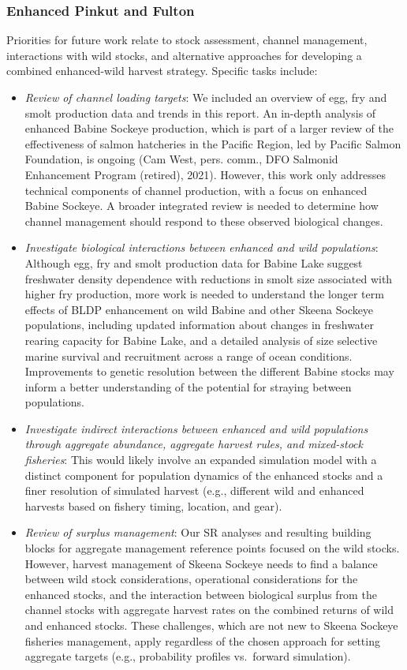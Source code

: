 \documentclass[french,11pt]{book}
\begin{document}
\subsubsection{Enhanced Pinkut and Fulton}\label{enhanced-pinkut-and-fulton}

Priorities for future work relate to stock assessment, channel management, interactions with wild stocks, and alternative approaches for developing a combined enhanced-wild harvest strategy. Specific tasks include:
\begin{itemize}

\item
  \emph{Review of channel loading targets}: We included an overview of egg, fry and smolt production data and trends in this report. An in-depth analysis of enhanced Babine Sockeye production, which is part of a larger review of the effectiveness of salmon hatcheries in the Pacific Region, led by Pacific Salmon Foundation, is ongoing (Cam West, pers. comm., DFO Salmonid Enhancement Program (retired), 2021). However, this work only addresses technical components of channel production, with a focus on enhanced Babine Sockeye. A broader integrated review is needed to determine how channel management should respond to these observed biological changes.
\item
  \emph{Investigate biological interactions between enhanced and wild populations}: Although egg, fry and smolt production data for Babine Lake suggest freshwater density dependence with reductions in smolt size associated with higher fry production, more work is needed to understand the longer term effects of BLDP enhancement on wild Babine and other Skeena Sockeye populations, including updated information about changes in freshwater rearing capacity for Babine Lake, and a detailed analysis of size selective marine survival and recruitment across a range of ocean conditions. Improvements to genetic resolution between the different Babine stocks may inform a better understanding of the potential for straying between populations.\\
\item
  \emph{Investigate indirect interactions between enhanced and wild populations through aggregate abundance, aggregate harvest rules, and mixed-stock fisheries}: This would likely involve an expanded simulation model with a distinct component for population dynamics of the enhanced stocks and a finer resolution of simulated harvest (e.g., different wild and enhanced harvests based on fishery timing, location, and gear).
\item
  \emph{Review of surplus management}: Our SR analyses and resulting building blocks for aggregate management reference points focused on the wild stocks. However, harvest management of Skeena Sockeye needs to find a balance between wild stock considerations, operational considerations for the enhanced stocks, and the interaction between biological surplus from the channel stocks with aggregate harvest rates on the combined returns of wild and enhanced stocks. These challenges, which are not new to Skeena Sockeye fisheries management, apply regardless of the chosen approach for setting aggregate targets (e.g., probability profiles vs.~forward simulation).
\end{itemize}
\end{document}
